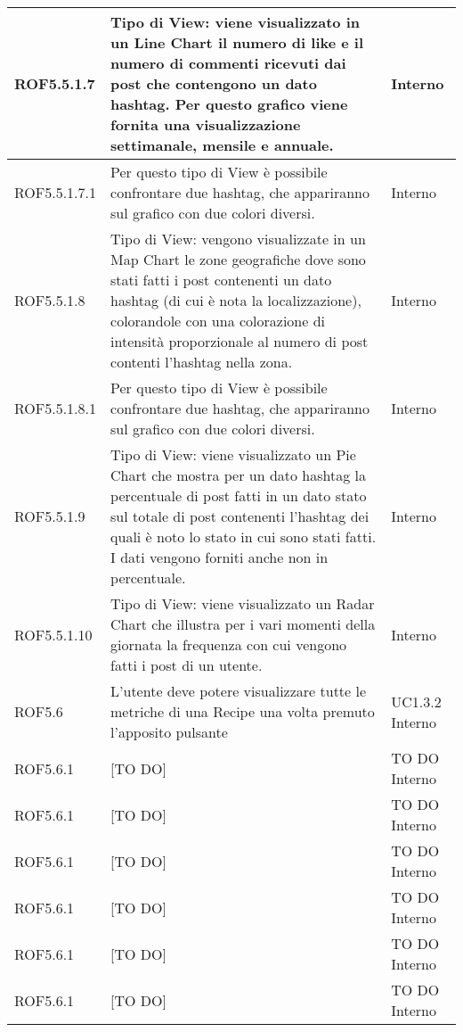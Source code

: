 \begin{center}
\begin{longtable}{| p{2.5cm} | p{8cm} | p{2cm} |}
		ROF5.5.1.7  &  Tipo di View: viene visualizzato in un Line Chart il numero di like e il numero di commenti ricevuti dai post che contengono un dato hashtag. Per questo grafico viene fornita una visualizzazione settimanale, mensile e annuale. & Interno \\
		\hline
		ROF5.5.1.7.1  &  Per questo tipo di View è possibile confrontare due hashtag, che appariranno sul grafico con due colori diversi. & Interno \\
		\hline
		ROF5.5.1.8  &  Tipo di View: vengono visualizzate in un Map Chart le zone geografiche dove sono stati fatti i post contenenti un dato hashtag (di cui è nota la localizzazione), colorandole con una colorazione di intensità proporzionale al numero di post contenti l'hashtag nella zona. & Interno \\
		\hline
		ROF5.5.1.8.1  &  Per questo tipo di View è possibile confrontare due hashtag, che appariranno sul grafico con due colori diversi. & Interno \\
		\hline
		ROF5.5.1.9  &  Tipo di View: viene visualizzato un Pie Chart che mostra per un dato hashtag la percentuale di post fatti in un dato stato sul totale di post contenenti l'hashtag dei quali è noto lo stato in cui sono stati fatti. I dati vengono forniti anche non in percentuale. & Interno \\
		\hline
		ROF5.5.1.10  &  Tipo di View: viene visualizzato un Radar Chart che illustra per i vari momenti della giornata la frequenza con cui vengono fatti i post di un utente. & Interno \\
		\hline

		ROF5.6  &  L'utente deve potere visualizzare tutte le metriche di una Recipe una volta premuto l'apposito pulsante  &  UC1.3.2 \newline Interno \\
		\hline
		ROF5.6.1  &  [TO DO]  &  TO DO \newline Interno \\
		\hline
		ROF5.6.1  &  [TO DO]  &  TO DO \newline Interno \\
		\hline
		ROF5.6.1  &  [TO DO]  &  TO DO \newline Interno \\
		\hline
		ROF5.6.1  &  [TO DO]  &  TO DO \newline Interno \\
		\hline
		ROF5.6.1  &  [TO DO]  &  TO DO \newline Interno \\
		\hline
		ROF5.6.1  &  [TO DO]  &  TO DO \newline Interno \\
		\hline





\end{longtable}
\end{center}
